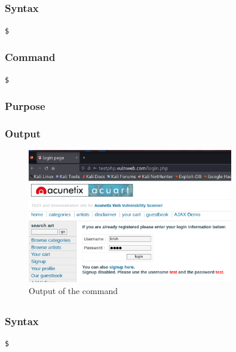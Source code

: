 \documentclass[11pt]{article}
\begin{document}
\subsection{}

\subsubsection*{Syntax}
\begin{verbatim}
$
\end{verbatim}

\subsubsection*{Command}
\begin{verbatim}
$
\end{verbatim}

\subsubsection*{Purpose}

\subsubsection*{Output}
\begin{figure}[H]
    \centering
    \includegraphics[width=0.8\textwidth]{assignment 8 (3).png}
    \caption{Output of the command}
    \label{fig:1}
\end{figure}

\subsection{}

\subsubsection*{Syntax}
\begin{verbatim}
$
\end{verbatim}
\end{document}
